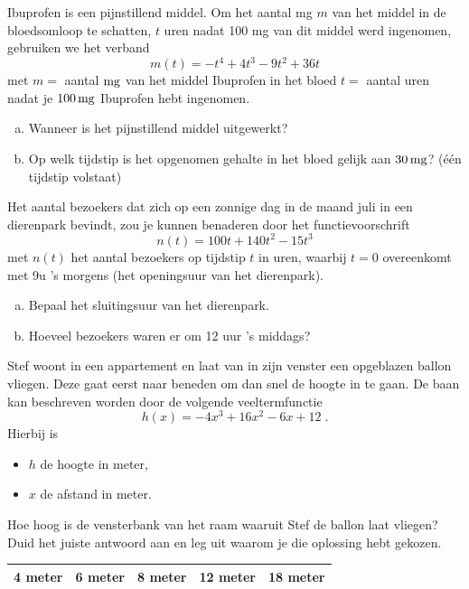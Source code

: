 \documentclass[12pt]{article}
\begin{document}
\begin{oefening}
Ibuprofen is een pijnstillend middel.  Om het aantal mg $m$ van het middel in de bloedsomloop te schatten, $t$ uren nadat 100 mg van dit middel werd ingenomen, gebruiken we het verband
$$m(t)=-t^4+4t^3-9t^2+36t$$
met $m =$ aantal $\mg$ van het middel Ibuprofen in het bloed $t = $ aantal uren nadat je $100 \mg$ Ibuprofen hebt ingenomen.
\begin{enumerate}[(a)]
  \item Wanneer is het pijnstillend middel uitgewerkt?
  \item Op welk tijdstip is het opgenomen gehalte in het bloed gelijk aan $30 \mg$? (één tijdstip volstaat)
\end{enumerate}
\end{oefening}

\begin{oefening}
Het aantal bezoekers dat zich op een zonnige dag in de maand juli in een dierenpark bevindt, zou je kunnen benaderen door het functievoorschrift
$$n(t)=100t+140t^2-15t^3$$
met $n(t)$ het aantal bezoekers op tijdstip $t$ in uren, waarbij $t=0$ overeenkomt met 9u 's morgens (het openingsuur van het dierenpark).
\begin{enumerate}[(a)]
  \item Bepaal het sluitingsuur van het dierenpark.
  \item Hoeveel bezoekers waren er om 12 uur 's middags?
\end{enumerate}
\end{oefening}

\begin{oefening}
Stef woont in een appartement en laat van in zijn venster een opgeblazen ballon vliegen.  Deze gaat eerst naar beneden om dan snel de hoogte in te gaan.  De baan kan beschreven worden door de volgende veeltermfunctie
$$h(x)=-4x^3+16x^2-6x+12\;.$$
Hierbij is
\begin{itemize}
  \item $h$ de hoogte in meter,
  \item $x$ de afstand in meter.
\end{itemize}
Hoe hoog is de vensterbank van het raam waaruit Stef de ballon laat vliegen? Duid het juiste antwoord aan en leg uit waarom je die oplossing hebt gekozen.\\
\begin{center}
  \begin{tabular}{|ccccc|}
  \hline
  4 meter & 6 meter & 8 meter & 12 meter & 18 meter\\[0.2cm]
  \hline    
  \end{tabular}
\end{center}
\end{oefening}
\end{document}
